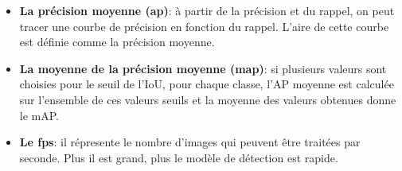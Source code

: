 \begin{itemize}
                \item \textbf{La précision moyenne (\acrshort{ap})}: à partir de la précision et du rappel, on peut tracer une courbe de précision en fonction du rappel.  L’aire de cette courbe est définie comme la précision moyenne.
            
                \item \textbf{La moyenne de la précision moyenne (\acrshort{map})}:  si plusieurs valeurs sont choisies pour le seuil de l'IoU, pour chaque classe, l'AP moyenne est calculée sur l'ensemble de ces valeurs seuils et la moyenne des valeurs obtenues donne le mAP. \cite{makina}
                \item \textbf{Le \acrfull{fps}}: il répresente le nombre d'images qui peuvent être traitées par seconde. Plus il est grand, plus le modèle de détection est rapide.
            \end{itemize}
    
